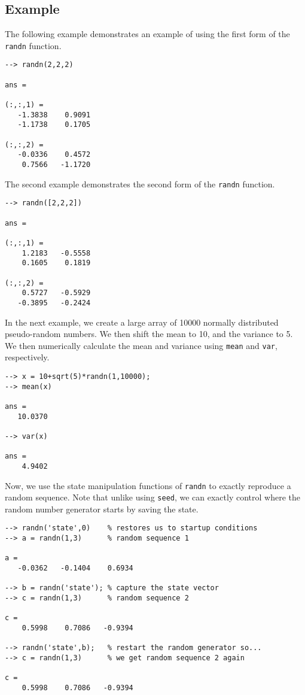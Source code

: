 \subsection{Example}

The following example demonstrates an example of using the first form of the \verb|randn| function.
\begin{verbatim}
--> randn(2,2,2)

ans = 

(:,:,1) = 
   -1.3838    0.9091 
   -1.1738    0.1705 

(:,:,2) = 
   -0.0336    0.4572 
    0.7566   -1.1720 
\end{verbatim}
The second example demonstrates the second form of the \verb|randn| function.
\begin{verbatim}
--> randn([2,2,2])

ans = 

(:,:,1) = 
    1.2183   -0.5558 
    0.1605    0.1819 

(:,:,2) = 
    0.5727   -0.5929 
   -0.3895   -0.2424 
\end{verbatim}
In the next example, we create a large array of 10000  normally distributed pseudo-random numbers.  We then shift the mean to 10, and the variance to 5.  We then numerically calculate the mean and variance using \verb|mean| and \verb|var|, respectively.
\begin{verbatim}
--> x = 10+sqrt(5)*randn(1,10000);
--> mean(x)

ans = 
   10.0370 

--> var(x)

ans = 
    4.9402 
\end{verbatim}
Now, we use the state manipulation functions of \verb|randn| to exactly reproduce 
a random sequence.  Note that unlike using \verb|seed|, we can exactly control where
the random number generator starts by saving the state.
\begin{verbatim}
--> randn('state',0)    % restores us to startup conditions
--> a = randn(1,3)      % random sequence 1

a = 
   -0.0362   -0.1404    0.6934 

--> b = randn('state'); % capture the state vector
--> c = randn(1,3)      % random sequence 2  

c = 
    0.5998    0.7086   -0.9394 

--> randn('state',b);   % restart the random generator so...
--> c = randn(1,3)      % we get random sequence 2 again

c = 
    0.5998    0.7086   -0.9394 
\end{verbatim}

